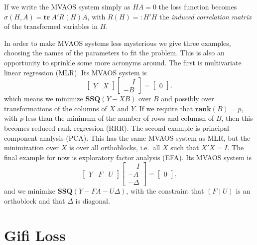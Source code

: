 \documentclass[
  12pt,
]{book}
\begin{document}
If we write the MVAOS system simply as \(HA=0\) the loss function becomes \(\sigma(H,A)=\mathbf{tr}\ A'R(H)A\), with
\(R(H)=:H'H\) the \emph{induced correlation matrix} of the transformed variables in \(H\).

In order to make MVAOS systems less mysterious we give three examples, choosing the names of the parameters to fit the problem. This is also an opportunity to sprinkle some more acronyms around. The first is multivariate linear regression (MLR). Its MVAOS system is
\[
\begin{bmatrix}
Y&X
\end{bmatrix}
\begin{bmatrix}
\phantom{-}I\\-B
\end{bmatrix}
=
\begin{bmatrix}
0
\end{bmatrix},
\]
which means we minimize \(\mathbf{SSQ}(Y-XB)\) over \(B\) and possibly over transformations of the columns of \(X\) and \(Y\). If we require that \(\mathbf{rank}(B)=p\), with \(p\) less than the minimum of the number of rows and columsn of \(B\), then this becomes reduced rank regression (RRR). The second example is principal component analysis (PCA). This has the same MVAOS system as MLR, but the minimization over \(X\) is over all orthoblocks, i.e.~all \(X\) such that \(X'X=I\). The final example for now is exploratory factor analysis (EFA). Its MVAOS system is
\[
\begin{bmatrix}
Y&F&U
\end{bmatrix}
\begin{bmatrix}
\phantom{-}I\\-A\\-\Delta
\end{bmatrix}
=
\begin{bmatrix}
0
\end{bmatrix},
\]
and we minimize \(\mathbf{SSQ}(Y-FA-U\Delta)\), with the constraint that \((F\mid U)\) is an orthoblock and that \(\Delta\) is diagonal.

\hypertarget{gifi-loss}{%
\section{Gifi Loss}\label{gifi-loss}}
\end{document}
